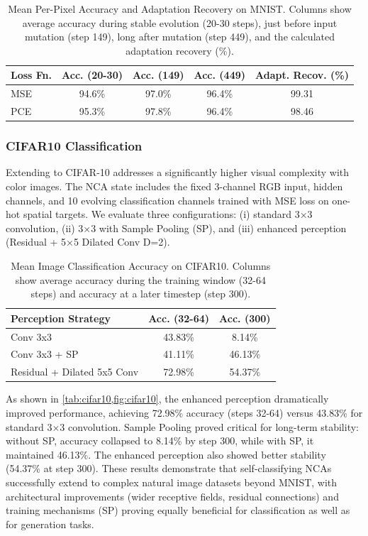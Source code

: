 \documentclass[10pt]{article} %
\begin{document}
\begin{table}[h]
\centering
\caption{Mean Per-Pixel Accuracy and Adaptation Recovery on MNIST. Columns show average accuracy during stable evolution (20-30 steps), just before input mutation (step 149), long after mutation (step 449), and the calculated adaptation recovery (\%).}
\label{tab:mnist_metrics}
\begin{tabular}{lcccc}
\hline
\textbf{Loss Fn.} & \textbf{Acc. (20-30)} & \textbf{Acc. (149)} & \textbf{Acc. (449)} & \textbf{Adapt. Recov. (\%)} \\ %
\hline
MSE & 94.6\% & 97.0\% & 96.4\% & 99.31 \\ 
PCE & 95.3\% & 97.8\% & 96.4\% & 98.46 \\ 
\hline
\end{tabular}
\end{table}

\subsubsection{CIFAR10 Classification}

Extending to CIFAR-10 addresses a significantly higher visual complexity with color images. The NCA state includes the fixed 3-channel RGB input, hidden channels, and 10 evolving classification channels trained with MSE loss on one-hot spatial targets. We evaluate three configurations: (i) standard 3×3 convolution, (ii) 3×3 with Sample Pooling (SP), and (iii) enhanced perception (Residual + 5×5 Dilated Conv D=2).

\begin{table}[h]
\centering
\caption{Mean Image Classification Accuracy on CIFAR10. Columns show average accuracy during the training window (32-64 steps) and accuracy at a later timestep (step 300).}
\label{tab:cifar10}
\begin{tabular}{lcc}
\hline
\textbf{Perception Strategy} & \textbf{Acc. (32-64)} & \textbf{Acc. (300)} \\ 
\hline
Conv 3x3                 & 43.83\% &  8.14\% \\
Conv 3x3 + SP            & 41.11\% & 46.13\% \\ 
Residual + Dilated 5x5 Conv & 72.98\% & 54.37\% \\
\hline
\end{tabular}
\end{table}

As shown in \cref{tab:cifar10,fig:cifar10}, the enhanced perception dramatically improved performance, achieving 72.98\% accuracy (steps 32-64) versus 43.83\% for standard 3×3 convolution. Sample Pooling proved critical for long-term stability: without SP, accuracy collapsed to 8.14\% by step 300, while with SP, it maintained 46.13\%. The enhanced perception also showed better stability (54.37\% at step 300). These results demonstrate that self-classifying NCAs successfully extend to complex natural image datasets beyond MNIST, with architectural improvements (wider receptive fields, residual connections) and training mechanisms (SP) proving equally beneficial for classification as well as for generation tasks.
\end{document}

